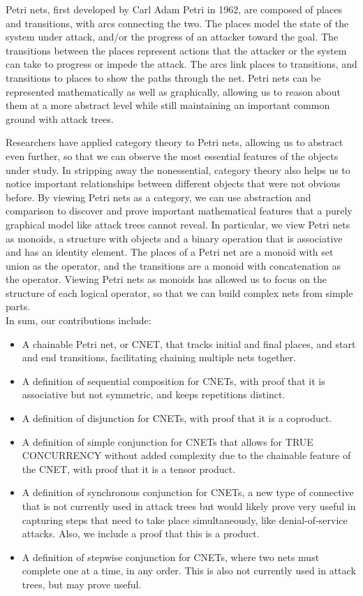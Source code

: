 \par Petri nets, first developed by Carl Adam Petri in 1962, are composed of places and transitions, with arcs connecting the two. The places model the state of the system under attack, and/or the progress of an attacker toward the goal. The transitions between the places represent actions that the attacker or the system can take to progress or impede the attack. The arcs link places to transitions, and transitions to places to show the paths through the net. Petri nets can be represented mathematically as well as graphically, allowing us to reason about them at a more abstract level while still maintaining an important common ground with attack trees. 
\par Researchers have applied category theory to Petri nets, allowing us to abstract even further, so that we can observe the most essential features of the objects under study. In stripping away the nonessential, category theory also helps us to notice important relationships between different objects that were not obvious before. By viewing Petri nets as a category, we can use abstraction and comparison to discover and prove important mathematical features that a purely graphical model like attack trees cannot reveal. In particular, we view Petri nets as monoids, a structure with objects and a binary operation that is associative and has an identity element. The places of a Petri net are a monoid with set union as the operator, and the transitions are a monoid with concatenation as the operator. Viewing Petri nets as monoids has allowed us to focus on the structure of each logical operator, so that we can build complex nets from simple parts.   
\\
In sum, our contributions include:
\begin{itemize}
  \item A chainable Petri net, or CNET, that tracks initial and final places, and start and end transitions, facilitating chaining multiple nets together.
  \item A definition of sequential composition for CNETs, with proof that it is associative but not symmetric, and keeps repetitions distinct.
  \item A definition of disjunction for CNETs, with proof that it is a coproduct. 
  \item A definition of simple conjunction for CNETs that allows for TRUE CONCURRENCY without added complexity due to the chainable feature of the CNET, with proof that it is a tensor product.
  \item A definition of synchronous conjunction for CNETs, a new type of connective that is not currently used in attack trees but would likely prove very useful in capturing steps that need to take place simultaneously, like denial-of-service attacks. Also, we include a proof that this is a product.
  \item A definition of stepwise conjunction for CNETs, where two nets must complete one at a time, in any order. This is also not currently used in attack trees, but may prove useful.
\end{itemize}
